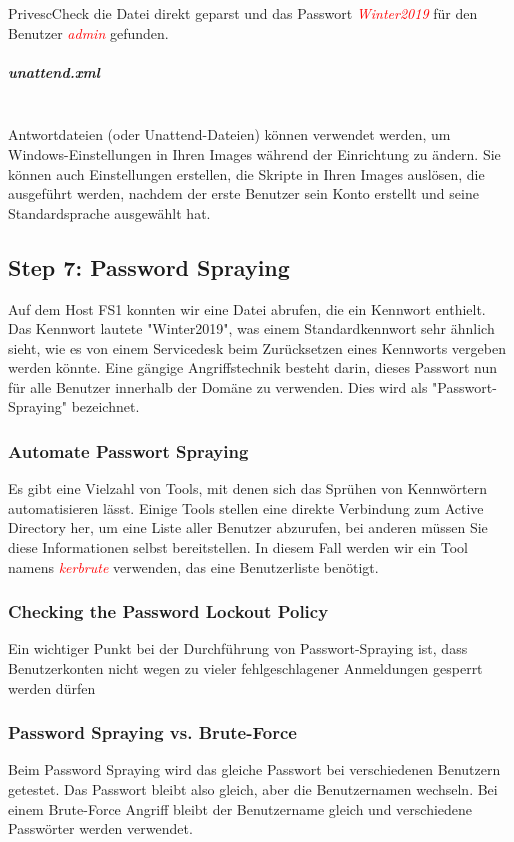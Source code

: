 PrivescCheck die Datei direkt geparst und das Passwort \textcolor{red}{\textit{Winter2019}} für den Benutzer \textcolor{red}{\textit{admin}} gefunden.

\subparagraph{unattend.xml}\mbox{} \\
Antwortdateien (oder Unattend-Dateien) können verwendet werden, um Windows-Einstellungen in Ihren Images während der Einrichtung zu ändern. Sie können auch Einstellungen erstellen, die Skripte in Ihren Images auslösen, die ausgeführt werden, nachdem der erste Benutzer sein Konto erstellt und seine Standardsprache ausgewählt hat.



\subsection{Step 7: Password Spraying}
Auf dem Host FS1 konnten wir eine Datei abrufen, die ein Kennwort enthielt. Das Kennwort lautete "Winter2019", was einem Standardkennwort sehr ähnlich sieht, wie es von einem Servicedesk beim Zurücksetzen eines Kennworts vergeben werden könnte.
Eine gängige Angriffstechnik besteht darin, dieses Passwort nun für alle Benutzer innerhalb der Domäne zu verwenden. Dies wird als "Passwort-Spraying" bezeichnet.

\subsubsection{Automate Passwort Spraying}
Es gibt eine Vielzahl von Tools, mit denen sich das Sprühen von Kennwörtern automatisieren lässt. Einige Tools stellen eine direkte Verbindung zum Active Directory her, um eine Liste aller Benutzer abzurufen, bei anderen müssen Sie diese Informationen selbst bereitstellen.
In diesem Fall werden wir ein Tool namens \textcolor{red}{\textit{kerbrute}} verwenden, das eine Benutzerliste benötigt.

\subsubsection{Checking the Password Lockout Policy}
Ein wichtiger Punkt bei der Durchführung von Passwort-Spraying ist, dass Benutzerkonten nicht wegen zu vieler fehlgeschlagener Anmeldungen gesperrt werden dürfen

\subsubsection{Password Spraying vs. Brute-Force}
Beim Password Spraying wird das gleiche Passwort bei verschiedenen Benutzern getestet. Das Passwort bleibt also gleich, aber die Benutzernamen wechseln.
Bei einem Brute-Force Angriff bleibt der Benutzername gleich und verschiedene Passwörter werden verwendet.

